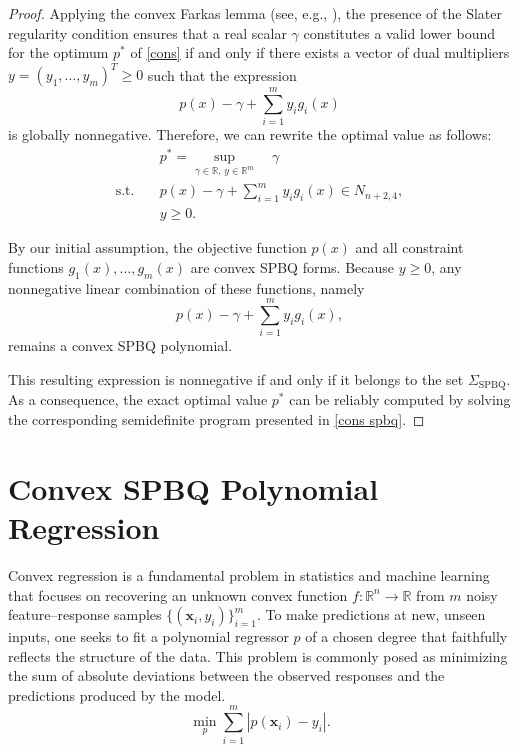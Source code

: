 \documentclass[12pt]{elsarticle}
\theoremstyle{definition}
\begin{document}
\begin{proof}
    Applying the convex Farkas lemma (see, e.g., \cite{stoer2012convexity}), the presence of the Slater regularity condition ensures that a real scalar $\gamma$ constitutes a valid lower bound for the optimum $p^*$ of \eqref{cons} if and only if there exists a vector of dual multipliers $y = (y_1, \dots, y_m)^T \ge 0$ such that the expression
\[
p(x) - \gamma + \sum_{i=1}^m y_i g_i(x)
\]
is globally nonnegative. Therefore, we can rewrite the optimal value as follows:
\begin{equation}
\begin{aligned}
&p^* = \sup_{\gamma \in \mathbb{R},\, y \in \mathbb{R}^m} \quad  \gamma \\
\text{s.t.} \quad 
& p(x) - \gamma + \sum_{i=1}^m y_i g_i(x) \in N_{n+2,4}, \\
& y \ge 0.
\end{aligned}
\end{equation}

By our initial assumption, the objective function $p(x)$ and all constraint functions $g_1(x), \dots, g_m(x)$ are convex SPBQ forms. Because $y \ge 0$, any nonnegative linear combination of these functions, namely
\[
p(x) - \gamma + \sum_{i=1}^m y_i g_i(x),
\]
remains a convex SPBQ polynomial. 

This resulting expression is nonnegative if and only if it belongs to the set $\Sigma_{\text{SPBQ}}$. As a consequence, the exact optimal value $p^*$ can be reliably computed by solving the corresponding semidefinite program presented in \eqref{cons spbq}.
\end{proof}

\section{Convex SPBQ Polynomial Regression}\label{regression app.}

Convex regression is a fundamental problem in statistics and machine learning that focuses on recovering an unknown convex function 
$f: \mathbb{R}^n \rightarrow \mathbb{R}$ from $m$ noisy feature–response samples 
$\{(\mathbf{x}_i, y_i)\}_{i=1}^m$. 
To make predictions at new, unseen inputs, one seeks to fit a polynomial regressor 
$p$ of a chosen degree that faithfully reflects the structure of the data. 
This problem is commonly posed as minimizing the sum of absolute deviations between the observed responses and the predictions produced by the model.
\begin{equation}
\min_{p} \sum_{i=1}^m \left| p(\mathbf{x}_i) - y_i \right|.
\end{equation}
\end{document}
